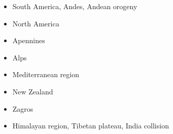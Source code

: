 \begin{itemize}
\item South America, Andes, Andean orogeny 
{\scriptsize
\cite{wdbo94b}
\cite{gusb00}
\cite{vavv02b}
\cite{baso05}\cite{soba05}
\cite{basv06}\cite{meph06}\cite{iabd06}
\cite{iabb07}
\cite{esfm08}\cite{heib08}\cite{iabu08}
\cite{kecw09}\cite{gecm09}
\cite{hucf12}\cite{shlm12}\cite{iadc12}
\cite{cudd15}\cite{ealw15}
\cite{robn16}\cite{marl16}\cite{chdf16}
\cite{sche17}
\cite{yamg19}
}
\item North America 
{\scriptsize
\cite{sabu73}
\cite{huha90}
\cite{bugm97}
\cite{besb06}
\cite{splg08}
\cite{splg09}
\cite{ghbh13}\cite{simi13}
\cite{riag15}
}
\item Apennines 
{\scriptsize
\cite{buwg98}
\cite{shpy07}
\cite{vami15}
}


\item Alps 
{\scriptsize
\cite{beeh96}
\cite{repe97}
\cite{desw98}
\cite{pfeb00}
\cite{bujl01}
\cite{pfsb02}
\cite{pimo03}
\cite{buge05}
\cite{masp07}
\cite{vifj08}
\cite{luws13}\cite{baes13}
\cite{bubj13}
\cite{bubj14}
\cite{scdu15}\cite{fohk15}
}
\item Mediterranean region 
{\scriptsize
\cite{pimo97}\cite{nesg97}
\cite{nesb99}
\cite{wosp00}
\cite{pimo03}
\cite{bofb10}\cite{fabe10}
\cite{chsv14}\cite{chsg14}\cite{vavs14}
\cite{mesj16}
\cite{spcv18}
}
\item {New Zealand} 
{\scriptsize
\cite{koon90}
\cite{brbe95}
\cite{bekh96}
\cite{wabb98}
\cite{babr99}
\cite{gedh02}\cite{pybf02}
\cite{gehd03}\cite{konc03}\cite{upke03}
\cite{libi06}
\cite{pyeg10}\cite{spgs10a}
\cite{grel12}
\cite{sths13}
}
\item {Zagros} 
{\scriptsize
\cite{vech06}
\cite{hamo10}
\cite{yakm11}
\cite{nipc13}
\cite{frba14}
\cite{ghbu14}
\cite{coyc16}
\cite{rugb17}
}
\item {Himalayan region, Tibetan plateau, India collision} 


\end{itemize}
